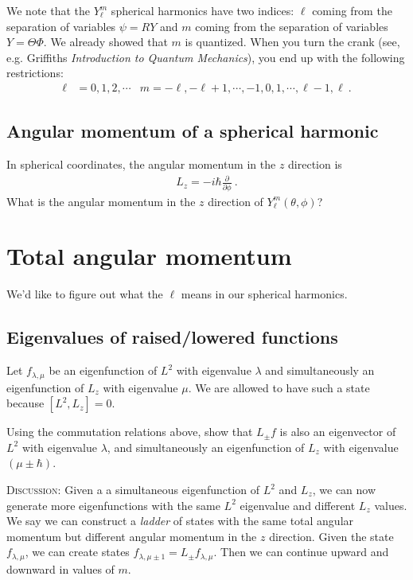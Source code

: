 \documentclass[12pt]{article}
\numberwithin{equation}{section}    %
\begin{document}
We note that the $Y_\ell^m$ spherical harmonics have two indices: $\ell$ coming from the separation of variables $\psi = RY$ and $m$ coming from the separation of variables $Y=\Theta\Phi$. We already showed that $m$ is quantized. When you turn the crank (see, e.g. Griffiths \emph{Introduction to Quantum Mechanics}), you end up with the following restrictions:
\begin{align}
	\ell &= 0, 1, 2, \cdots
	&
	m = -\ell, -\ell+1, \cdots, -1, 0, 1, \cdots, \ell-1, \ell \ .
\end{align}

\subsection{Angular momentum of a spherical harmonic}

In spherical coordinates, the angular momentum in the $z$ direction is
\begin{align}
	L_z = -i\hbar \frac{\partial}{\partial\phi} \ .
\end{align}
What is the angular momentum in the $z$ direction of $Y^m_\ell(\theta,\phi)$?




\section{Total angular momentum}

We'd like to figure out what the $\ell$ means in our spherical harmonics.



\subsection{Eigenvalues of raised/lowered functions}

Let $f_{\lambda,\mu}$ be an eigenfunction of $L^2$ with eigenvalue $\lambda$ and simultaneously an eigenfunction of $L_z$ with eigenvalue $\mu$. We are allowed to have such a state because $[L^2, L_z]=0$.

Using the commutation relations above, show that $L_\pm f$ is also an eigenvector of $L^2$ with eigenvalue $\lambda$, and simultaneously an eigenfunction of $L_z$ with eigenvalue $(\mu \pm \hbar)$. 

\textsc{Discussion:} Given a a simultaneous eigenfunction of $L^2$ and $L_z$, we can now generate more eigenfunctions with the same $L^2$ eigenvalue and different $L_z$ values. We say we can construct a \emph{ladder} of states with the same total angular momentum but different angular momentum in the $z$ direction. Given the state $f_{\lambda,\mu}$, we can create states $f_{\lambda,\mu\pm 1} = L_\pm f_{\lambda,\mu}$. Then we can continue upward and downward in values of $m$.
\end{document}
